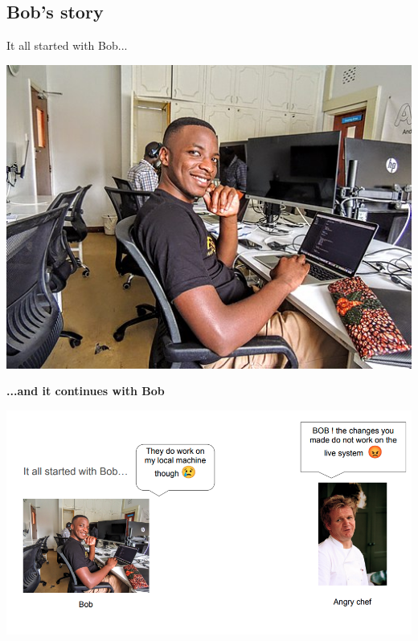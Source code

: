 
\subsection{Bob's story}
\begin{frame}{It all started with Bob...}
    \begin{center}
        \includegraphics[width=.7\textwidth]{./assets/bob}

        \textbf{\Large{...and it continues with Bob}}
    \end{center}
\end{frame}

\begin{frame}
    \begin{center}
        \includegraphics[width=.8\textwidth]{./assets/bob2}
    \end{center}
\end{frame}


